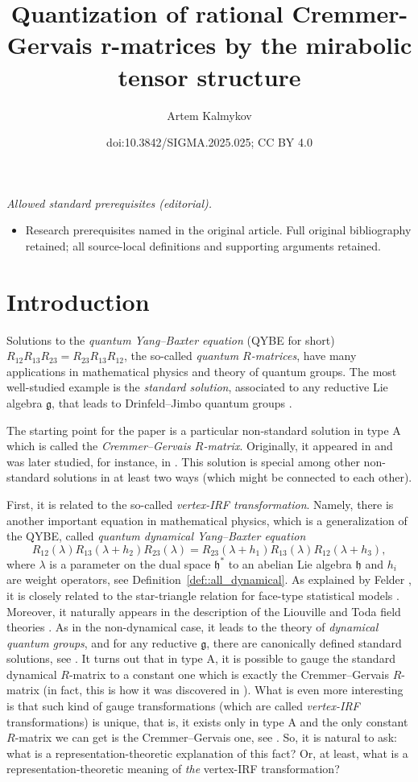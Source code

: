 \documentclass[10pt,a4paper]{amsart}
\title{Quantization of rational Cremmer-Gervais r-matrices by the mirabolic tensor structure}
\author{Artem Kalmykov}
\date{doi:10.3842/SIGMA.2025.025; CC BY 4.0}
\numberwithin{equation}{section}
\newcommand{\g}{\mathfrak{g}}
\newcommand{\h}{\mathfrak{h}}
\begin{document}
\maketitle
\noindent\textit{Allowed standard prerequisites (editorial).}\begin{itemize}
\item Research prerequisites named in the original article. Full original bibliography retained; all source-local definitions and supporting arguments retained.
\end{itemize}\medskip
\section{Introduction}
	
Solutions to the \emph{quantum Yang--Baxter equation} (QYBE for short)
$R_{12} R_{13} R_{23} = R_{23} R_{13} R_{12}$,
	the so-called \emph{quantum $R$-matrices}, have many applications in mathematical physics and theory of quantum groups. The most well-studied example is the \emph{standard solution}, associated to any reductive Lie algebra $\g$, that leads to Drinfeld--Jimbo quantum groups \cite{DrinfeldICM,Jimbo}.
	
The starting point for the paper is a particular non-standard solution in type A which is called the \emph{Cremmer--Gervais $R$-matrix}. Originally, it appeared in \cite{CremmerGervais} and was later studied, for instance, in \cite{BuffenoirRocheTerras,Hodges}. This solution is special among other non-standard solutions in at least two ways (which might be connected to each other).
	
First, it is related to the so-called \emph{vertex-IRF transformation}. Namely, there is another important equation in mathematical physics, which is a generalization of the QYBE, called \emph{quantum dynamical Yang--Baxter equation}
	\[
	R_{12}(\lambda) R_{13}(\lambda+h_2) R_{23} (\lambda)= R_{23}(\lambda + h_1) R_{13}(\lambda) R_{12}(\lambda + h_3),
	\]
	where $\lambda$ is a parameter on the dual space $\h^*$ to an abelian Lie algebra $\h$ and $h_i$ are weight operators, see Definition~\ref{def::all_dynamical}. As explained by Felder \cite{Felder}, it is closely related to the star-triangle relation for face-type statistical models \cite{Baxter}. Moreover, it naturally appears in the description of the Liouville and Toda field theories \cite{GervaisNeveu}. As in the non-dynamical case, it leads to the theory of \emph{dynamical quantum groups}, and for any reductive $\g$, there are canonically defined standard solutions, see \cite{EtingofICM,EtingofSchiffmann}. It turns out that in type A, it is possible to gauge the standard dynamical $R$-matrix to a constant one which is exactly the Cremmer--Gervais $R$-matrix (in fact, this is how it was discovered in \cite{CremmerGervais}). What is even more interesting is that such kind of gauge transformations (which are called \emph{vertex-IRF} transformations) is unique, that is, it exists only in type A and the only constant $R$-matrix we can get is the Cremmer--Gervais one, see \cite{BalogDabrowskiFeher}. So, it is natural to ask: what is a representation-theoretic explanation of this fact? Or, at least, what is a representation-theoretic meaning of \emph{the} vertex-IRF transformation?
	
\end{document}
